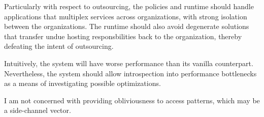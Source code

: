 %
Particularly with respect to outsourcing, the policies
and runtime should handle applications that multiplex services across organizations,
with strong isolation between the organizations.
%
The runtime should also avoid degenerate solutions
that transfer undue hosting responsbilities back to the organization, thereby
defeating the intent of outsourcing.


Intuitively, the system will have worse performance than its vanilla
counterpart.
%
Nevertheless, the system should allow introspection into performance
bottlenecks as a means of investigating possible optimizations.


%
I am  not concerned with providing obliviousness to access patterns,
which may be a side-channel vector.
